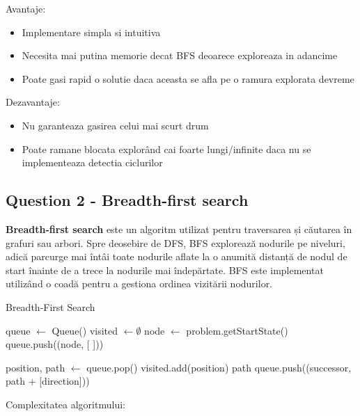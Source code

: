 \par Avantaje:
\begin{itemize}
	\item Implementare simpla si intuitiva
	\item Necesita mai putina memorie decat BFS deoarece exploreaza in adancime
	\item Poate gasi rapid o solutie daca aceasta se afla pe o ramura explorata devreme
\end{itemize}

\par Dezavantaje:
\begin{itemize}
	\item Nu garanteaza gasirea celui mai scurt drum
	\item Poate ramane blocata explorând cai foarte lungi/infinite daca nu se implementeaza detectia ciclurilor
\end{itemize}

\pagebreak

\subsection{Question 2 - Breadth-first search}
\par \textbf{Breadth-first search} este un algoritm utilizat pentru traversarea și căutarea în grafuri sau arbori. Spre deosebire de DFS, BFS explorează nodurile pe niveluri, adică parcurge mai întâi toate nodurile aflate la o anumită distanță de nodul de start înainte de a trece la nodurile mai îndepărtate. BFS este implementat utilizând o coadă pentru a gestiona ordinea vizitării nodurilor.

\begin{algorithm}
\caption{Breadth-First Search}
\begin{algorithmic}[1]
    \State queue $\gets$ Queue()
    \State visited $\gets \emptyset$
    \State node $\gets$ problem.getStartState()
    \State queue.push((node, [ ]))
    
        \State position, path $\gets$ queue.pop()
            \State visited.add(position)
                \Return path
            \EndIf
                    \State queue.push((successor, path + [direction]))
                \EndIf
            \EndFor
        \EndIf
    \EndWhile \\
    \Return [ ]
\EndFunction
\end{algorithmic}
\end{algorithm}
\par Complexitatea algoritmului:

